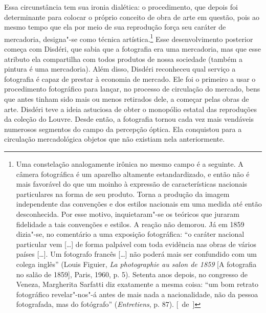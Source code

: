 Essa circunstância tem sua ironia dialética: o procedimento, que depois
foi determinante para colocar o próprio conceito de obra de arte
em questão, pois ao mesmo tempo que ela por meio de sua reprodução força seu
caráter de mercadoria, designa"-se como técnica artística.\footnote{Uma
  constelação analogamente irônica no mesmo campo é a seguinte. A câmera
  fotográfica é um aparelho altamente estandardizado, e então não é mais
  favorável do que um moinho à expressão de características nacionais
  particulares na forma de seu produto. Torna a produção da imagem
  independente das convenções e dos estilos nacionais em uma medida até
  então desconhecida. Por esse motivo, inquietaram"-se os teóricos que
  juraram fidelidade a tais convenções e estilos. A reação não demorou.
  Já em 1859 dizia"-se, no comentário a uma exposição fotográfica: ``o
  caráter nacional particular vem {[}\ldots{}{]} de forma palpável com toda
  evidência nas obras de vários países {[}\ldots{}{]}. Um fotografo francês
  {[}\ldots{}{]} não poderá mais ser confundido com um colega inglês'' (Louis
    Figuier, \emph{La photographie au salon de 1859} {[}A fotografia no
  salão de 1859{]}, Paris, 1960, p. 5). Setenta anos depois, no congresso
  de Veneza, Margherita Sarfatti diz exatamente a mesma coisa: ``um bom
  retrato fotográfico revelar"-nos"-á antes de mais nada a nacionalidade,
  não da pessoa fotografada, mas do fotógrafo'' (\emph{Entretiens}, p. 87). [~de~]}
Esse desenvolvimento posterior começa com Disdéri, que sabia que a
fotografia era uma mercadoria, mas que esse atributo ela compartilha com
todos produtos de nossa sociedade (também a pintura é uma mercadoria).
Além disso, Disdéri reconheceu qual serviço a fotografia é capaz de
prestar à economia de mercado. Ele foi o primeiro a usar o procedimento
fotográfico para lançar, no processo de circulação do mercado, bens que antes tinham
sido mais ou menos retirados dele, a começar pelas obras de
arte. Disdéri teve a ideia astuciosa de obter o monopólio estatal das
reproduções da coleção do Louvre. Desde então, a fotografia tornou cada vez mais vendáveis
numerosos segmentos do campo da percepção óptica. Ela
conquistou para a circulação mercadológica objetos que não
existiam nela anteriormente.

